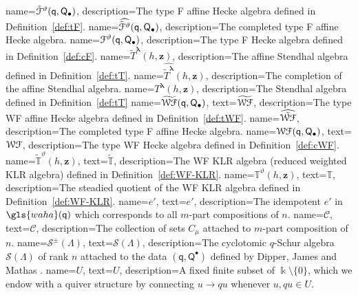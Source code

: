 \documentclass[ALCO,ThmDefs,Unicode,epreuves]{cedram}
\newcommand{\Bz}{\mathbf{z}}
\newcommand{\pq}{\mathsf{q}}
\newcommand{\K}{\Bbbk}%
\newcommand{\la}{\lambda}
\newcommand{\PQ}{\mathsf{Q}}
\newcommand{\dalg}{\mathbb{T}}
\newcommand{\waha}{\gls{waha}}
\begin{document}
  {
  name={\ensuremath{{\tilde{\EuScript{F}}^\vartheta (\pq,\PQ_{\bullet})}}},
   description={The type F affine Hecke algebra defined in
  Definition~\ref{def:tF}.}
 }
       {
  name={\ensuremath{\widehat{\tilde{\EuScript{F}}^\vartheta}
  (\pq,\PQ_\bullet)}},
   description={The completed type F affine Hecke algebra.}
 }   {
  name={\ensuremath{\EuScript{F}^\vartheta
  (\pq,\PQ_\bullet)}},
   description={The type F Hecke algebra defined in
  Definition~\ref{def:cF}.}
 }
   {
  name={{\ensuremath{\tilde{T}^{\boldsymbol{\la}}(h,\Bz)}}},
   description={The affine Stendhal algebra defined in
  Definition~\ref{def:tT}.}
 }
       {
  name={\ensuremath{\widehat{\tilde{T}^{\boldsymbol{{\la}}}}(h,\Bz)}},
   description={The completion of the  affine Stendhal algebra.}
 }
  {
  name={\ensuremath{T^{\boldsymbol{\la}} (h,\Bz)}},
   description={The Stendhal algebra defined in
  Definition~\ref{def:tT}}
  }
    {
  name={\ensuremath{{\EuScript{\widetilde{WF}} (\pq,\PQ_{\bullet})}}},
  text={\ensuremath{{\EuScript{\widetilde{WF}}}}},
   description={The type WF affine Hecke algebra defined in
  Definition~\ref{def:tWF}.}
 }
       {
  name={\ensuremath{\widehat{\tilde{\EuScript{WF}}}}},
   description={The completed type F affine Hecke algebra.}
 }
  {
  name={\ensuremath{\EuScript{{WF}} (\pq,\PQ_{\bullet})}},
  text={\ensuremath{\EuScript{{WF}}}},
   description={The type WF Hecke algebra defined in
  Definition~\ref{def:cWF}.}
 }
    {
  name={{\ensuremath{\tilde{\dalg}^\vartheta (h,\Bz)}}},
  text={{\ensuremath{\tilde{\dalg}}}},
   description={The WF KLR algebra (reduced weighted KLR algebra) defined in
  Definition~\ref{def:WF-KLR}.}
 }
  {
  name={\ensuremath{\dalg ^\vartheta (h,\Bz)}},
  text={\ensuremath{\dalg}},
   description={The steadied quotient of the WF KLR algebra defined in
  Definition~\ref{def:WF-KLR}.}
  }
  {
  name={\ensuremath{e'}},
  text={\ensuremath{e'}},
   description={The idempotent $e'$ in $\waha(\pq)$ which corresponds
   to all $m$-part compositions of $n$.}
  }
   {
  name={\ensuremath{\mathscr{C}}},
  text={\ensuremath{\mathscr{C}}},
   description={The collection of sets $C_\mu$ attached to $m$-part
   composition of $n$.}
  }
     {
  name={\ensuremath{\mathscr{S}^\pm(\Lambda)}},
  text={\ensuremath{\mathscr{S}(\Lambda)}},
   description={The cyclotomic $q$-Schur algebra $\mathscr{S}(\Lambda)$ of rank $n$  attached to the
data $(\pq,\PQ^\bullet)$ defined by Dipper, James and Mathas
\cite[6.1]{DJM}.}
  }
     {
  name={\ensuremath{U}},
  text={\ensuremath{U}},
   description={A fixed finite subset of $\K\setminus\{0\}$, which we
   endow with a quiver structure by connecting $u\to qu$ whenever
   $u,qu\in U$.}
  }
\end{document}
